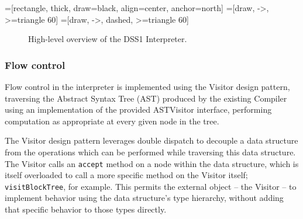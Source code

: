 \documentclass[12pt,letterpaper]{article}
\begin{document}
{=[rectangle,
                   thick, 
                   draw=black, 
                   align=center,
                   anchor=north]
=[draw, ->, >=triangle 60]
=[draw, ->, dashed, >=triangle 60]
\begin{figure}
\begin{center}
\end{center}
\caption{High-level overview of the DSS1 Interpreter.}
\label{fig:INTERPRETER}
\end{figure}

\subsubsection{Flow control} \label{sec:FLOW_CONTROL}

	Flow control in the interpreter is implemented using the Visitor design pattern, traversing the Abstract Syntax Tree (AST) produced by the existing Compiler using an implementation of the provided ASTVisitor interface, performing computation as appropriate at every given node in the tree.

	The Visitor design pattern leverages double dispatch to decouple a data structure from the operations which can be performed while traversing this data structure. The Visitor calls an \texttt{accept} method on a node within the data structure, which is itself overloaded to call a more specific method on the Visitor itself; \texttt{visitBlockTree}, for example. This permits the external object – the Visitor – to implement behavior using the data structure's type hierarchy, without adding that specific behavior to those types directly.

}
\end{document}
